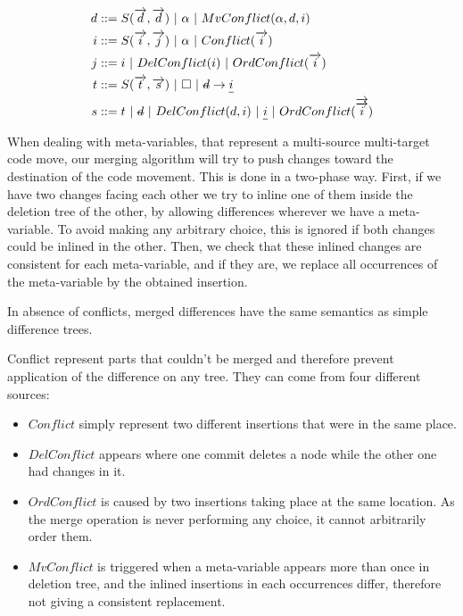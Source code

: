 \documentclass[a4paper,10pt]{article}
\newcommand{\typsep}{\ |\ }
\begin{document}
\begin{align*}
d &::= S(\overrightarrow{d}, \overrightarrow{d}) \typsep \alpha \typsep MvConflict(\alpha, d, i) \\
i &::= S(\overrightarrow{i}, \overrightarrow{j}) \typsep \alpha \typsep Conflict(\overrightarrow{i})\\
j &::= i \typsep DelConflict(i) \typsep OrdConflict(\overrightarrow{i})\\
t &::= S(\overrightarrow{t}, \overrightarrow{s}) \typsep \square \typsep  \text{\st{$d$}} \rightarrow \text{\ul{$i$}}\\
s &::= t \typsep \text{\st{$d$}} \typsep DelConflict(d, i) \typsep \text{\ul{$i$}} \typsep OrdConflict(\overrightarrow{\overrightarrow{i}})\\
\end{align*}

When dealing with meta-variables, that represent a multi-source multi-target code move, our merging algorithm will try to push changes toward the destination of the code movement.
This is done in a two-phase way. First, if we have two changes facing each other we try to inline one of them inside the deletion tree of the other, by allowing differences wherever we have a meta-variable. To avoid making any arbitrary choice, this is ignored if both changes could be inlined in the other. Then, we check that these inlined changes are consistent for each meta-variable, and if they are, we replace all occurrences of the meta-variable by the obtained insertion.

In absence of conflicts, merged differences have the same semantics as simple difference trees.

Conflict represent parts that couldn't be merged and therefore prevent application of the difference on any tree. They can come from four different sources:
\begin{itemize}
  \item $Conflict$ simply represent two different insertions that were in the same place.
  \item $DelConflict$ appears where one commit deletes a node while the other one had changes in it.
  \item $OrdConflict$ is caused by two insertions taking place at the same location. As the merge operation is never performing any choice, it cannot arbitrarily order them.
  \item $MvConflict$ is triggered when a meta-variable appears more than once in deletion tree, and the inlined insertions in each occurrences differ, therefore not giving a consistent replacement.
\end{itemize}
\end{document}
